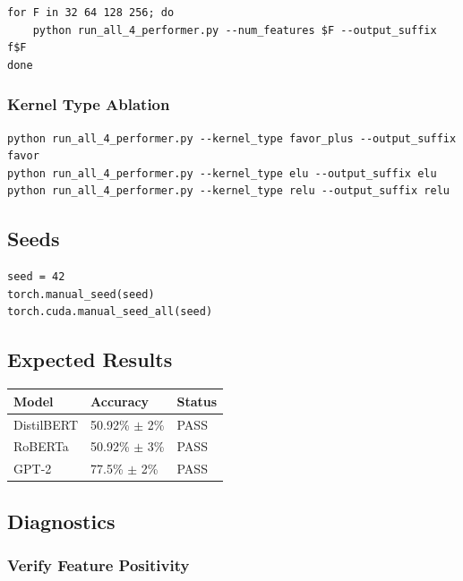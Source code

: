 \begin{lstlisting}
for F in 32 64 128 256; do
    python run_all_4_performer.py --num_features $F --output_suffix f$F
done
\end{lstlisting}

\subsubsection{Kernel Type Ablation}

\begin{lstlisting}
python run_all_4_performer.py --kernel_type favor_plus --output_suffix favor
python run_all_4_performer.py --kernel_type elu --output_suffix elu
python run_all_4_performer.py --kernel_type relu --output_suffix relu
\end{lstlisting}

\subsection{Seeds}

\begin{lstlisting}
seed = 42
torch.manual_seed(seed)
torch.cuda.manual_seed_all(seed)
\end{lstlisting}

\subsection{Expected Results}

\begin{table}[H]
\centering
\small
\begin{tabular}{lll}
\toprule
\textbf{Model} & \textbf{Accuracy} & \textbf{Status} \\
\midrule
DistilBERT & 50.92\% $\pm$ 2\% & PASS \\
RoBERTa & 50.92\% $\pm$ 3\% & PASS \\
GPT-2 & 77.5\% $\pm$ 2\% & PASS \\
\bottomrule
\end{tabular}
\end{table}

\subsection{Diagnostics}

\subsubsection{Verify Feature Positivity}


